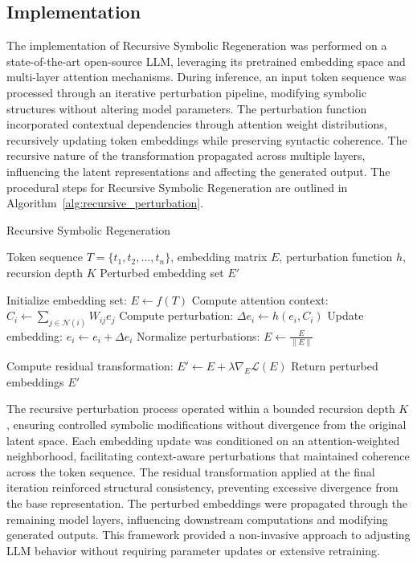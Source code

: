 \documentclass[5p,times]{elsarticle}
\begin{document}
\subsection{Implementation}

The implementation of Recursive Symbolic Regeneration was performed on a state-of-the-art open-source LLM, leveraging its pretrained embedding space and multi-layer attention mechanisms. During inference, an input token sequence was processed through an iterative perturbation pipeline, modifying symbolic structures without altering model parameters. The perturbation function incorporated contextual dependencies through attention weight distributions, recursively updating token embeddings while preserving syntactic coherence. The recursive nature of the transformation propagated across multiple layers, influencing the latent representations and affecting the generated output. The procedural steps for Recursive Symbolic Regeneration are outlined in Algorithm~\ref{alg:recursive_perturbation}.

\begin{algorithm}
	\caption{Recursive Symbolic Regeneration}\label{alg:recursive_perturbation}
	\begin{algorithmic}[1]
		\Require Token sequence \( T = \{t_1, t_2, \dots, t_n\} \), embedding matrix \( E \), perturbation function \( h \), recursion depth \( K \)
		\Ensure Perturbed embedding set \( E' \)
		
		\State Initialize embedding set: \( E \gets f(T) \)
		 
		\State Compute attention context: \( C_i \gets \sum_{j \in \mathcal{N}(i)} W_{ij} e_j \)
		\State Compute perturbation: \( \Delta e_i \gets h(e_i, C_i) \)
		\State Update embedding: \( e_i \gets e_i + \Delta e_i \)
		\EndFor
		\State Normalize perturbations: \( E \gets \frac{E}{\|E\|} \)
		\EndFor
		
		\State Compute residual transformation: \( E' \gets E + \lambda \nabla_E \mathcal{L}(E) \) 
		\State Return perturbed embeddings \( E' \)
	\end{algorithmic}
\end{algorithm}

The recursive perturbation process operated within a bounded recursion depth \( K \), ensuring controlled symbolic modifications without divergence from the original latent space. Each embedding update was conditioned on an attention-weighted neighborhood, facilitating context-aware perturbations that maintained coherence across the token sequence. The residual transformation applied at the final iteration reinforced structural consistency, preventing excessive divergence from the base representation. The perturbed embeddings were propagated through the remaining model layers, influencing downstream computations and modifying generated outputs. This framework provided a non-invasive approach to adjusting LLM behavior without requiring parameter updates or extensive retraining.
\end{document}
